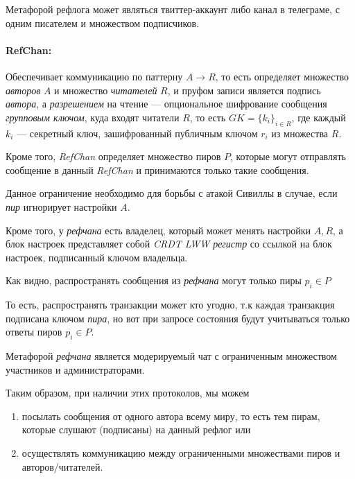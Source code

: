 \documentclass[11pt,a4paper]{article}
\newcommand{\term}[2]{\textit{#2}}
\newcommand{\Peer}{\term{peer}{пир}}
\begin{document}
Метафорой рефлога может являться твиттер-аккаунт либо канал в телеграме, с одним
писателем и множеством подписчиков.


\paragraph{RefChan:}

Обеспечивает коммуникацию по паттерну ${A} \rightarrow {R}$, то есть определяет
множество \term{author}{авторов} $A$ и множество \term{reader}{читателей} $R$, и
пруфом записи является подпись \term{author}{автора}, а
\term{permission}{разрешением} на чтение --- опциональное шифрование сообщения
\term{GK0}{групповым ключом}, куда входят читатели $R$, то есть $GK = \{ k_i
\}_{i \in R}$, где каждый $k_i$ --- секретный ключ, зашифрованный публичным
ключом $r_i$ из множества $R$.

Кроме того, \term{refchan}{RefChan} определяет множество пиров ${P}$, которые
могут отправлять сообщение в данный \term{refchan}{RefChan} и принимаются только
такие сообщения.

Данное ограничение необходимо для борьбы с атакой Сивиллы в случае, если \Peer{}
игнорирует настройки ${A}$.

Кроме того, у \term{refchan}{рефчана} есть владелец, который может менять
настройки $A,R$, а блок настроек представляет собой \term{lww}{CRDT LWW регистр}
со ссылкой на блок настроек, подписанный ключом владельца.

Как видно, распространять сообщения из \term{refchan}{рефчана} могут только пиры
$p_i \in P$

То есть, распространять транзакции может кто угодно, т.к каждая транзакция
подписана ключом \term{peer}{пира}, но вот при запросе состояния будут
учитываться только ответы пиров $p_i \in P$.

Метафорой \term{refchan}{рефчана} является модерируемый чат с ограниченным
множеством участников и администраторами.

Таким образом, при наличии этих протоколов, мы можем

\begin{enumerate}

\item посылать сообщения от одного автора всему миру, то есть тем пирам, которые
  слушают (подписаны) на данный рефлог или

\item осуществлять коммуникацию между ограниченными множествами пиров и
  авторов/читателей.

\end{enumerate}
\end{document}
